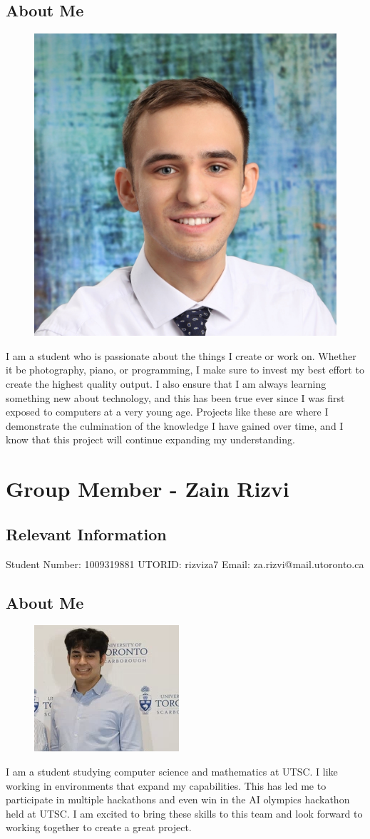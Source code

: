 \documentclass{article}
\begin{document}
\subsection{About Me}
\begin{figure}[h]
    \centering
    \includegraphics[width=0.25\linewidth]{images/SebPhoto.jpg}
\end{figure}
I am a student who is passionate about the things I create or work on. Whether it be photography, piano, or programming, I make sure to invest my best effort to create the highest quality output. I also ensure that I am always learning something new about technology, and this has been true ever since I was first exposed to computers at a very young age. Projects like these are where I demonstrate the culmination of the knowledge I have gained over time, and I know that this project will continue expanding my understanding.

\noindent\makebox[\linewidth]{\rule{\paperwidth}{0.4pt}}

\section{Group Member - Zain Rizvi}
\subsection{Relevant Information}
    Student Number: 1009319881  \newline
    UTORID: rizviza7  \newline
    Email: za.rizvi@mail.utoronto.ca
\subsection{About Me}
\begin{figure}[h]
    \centering
    \includegraphics[width=0.25\linewidth]{images/ZainRizvi.png}
\end{figure}
I am a student studying computer science and mathematics at UTSC. I like working in environments that expand my capabilities. This has led me to participate in multiple hackathons and even win in the AI olympics hackathon held at UTSC. I am excited to bring these skills to this team and look forward to working together to create a great project.
\end{document}
